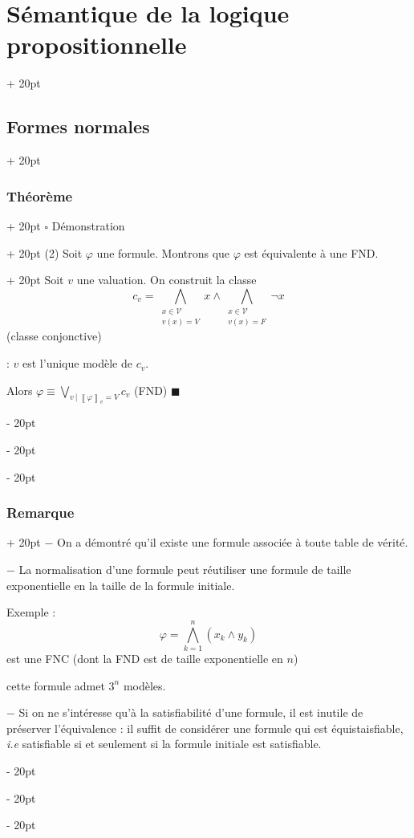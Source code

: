 \documentclass[a4paper, 12pt, twoside]{article}
\newcommand{\lrbb}[1]{\left\llbracket #1 \right\rrbracket}
\newcommand{\ind}[1][20pt]{\advance\leftskip + #1}
\newcommand{\deind}[1][20pt]{\advance\leftskip - #1}
\newenvironment{indt}[2][20pt]{#2 \par \ind[#1]}{\par \deind} %
\begin{document}
\begin{indt}{\section{Sémantique de la logique propositionnelle}}
\begin{indt}{\subsection{Formes normales}}
\begin{indt}{\subsubsection{Théorème}}
\begin{indt}{$\square$ Démonstration}
                    \begin{indt}{(2) Soit $\varphi$ une formule. Montrons que $\varphi$ est équivalente à une FND.}
                        Soit $v$ une valuation. On construit la classe
                            \[ c_v = \bigwedge_{\substack{x \in \mathcal V \\ v(x) = V}} x \wedge \bigwedge_{\substack{x \in \mathcal V \\ v(x) = F}} \neg x \]
                        (classe conjonctive)
                        
                         : $v$ est l'unique modèle de $c_v$.
                        
                        \vspace{12pt}
                        
                        Alors $\varphi \equiv \displaystyle \bigvee_{v\ |\ \lrbb{\varphi}_v = V} c_v$ (FND) $\blacksquare$
                    \end{indt}
                \end{indt}
            \end{indt}
            
            \vspace{12pt}
            
            \begin{indt}{\subsubsection{Remarque}}
                $-$ On a démontré qu'il existe une formule associée à toute
                table de vérité.
                
                $-$ La normalisation d'une formule peut réutiliser une formule de taille exponentielle en la taille de la formule initiale.
                
                Exemple :
                    \[ \varphi = \bigwedge_{k = 1}^n (x_k \wedge y_k) \]
                est une FNC (dont la FND est de taille exponentielle en $n$)
                
                 cette formule admet $3^n$ modèles.
                
                \vspace{12pt}
                
                $-$ Si on ne s'intéresse qu'à la satisfiabilité d'une formule, il est inutile de préserver l'équivalence : il suffit de considérer une formule qui est équistaisfiable, \textit{i.e} satisfiable si et seulement si la formule initiale est satisfiable.
            \end{indt}
            

\end{indt}
\end{indt}
\end{document}
